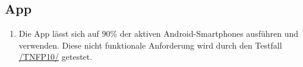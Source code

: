\subsection*{App}

\begin{samepage}
    \begin{enumerate}[label=\textbf{/NFP\arabic*0/}, align=left]
        \item \label{/NFP10/} Die App lässt sich auf 90\% der aktiven \Gls{Android}-\Gls{Smartphone}s ausführen und verwenden. Diese nicht funktionale Anforderung wird durch den Testfall \hyperref[/TNFP10/]{/TNFP10/} getestet.
    \end{enumerate}
\end{samepage}